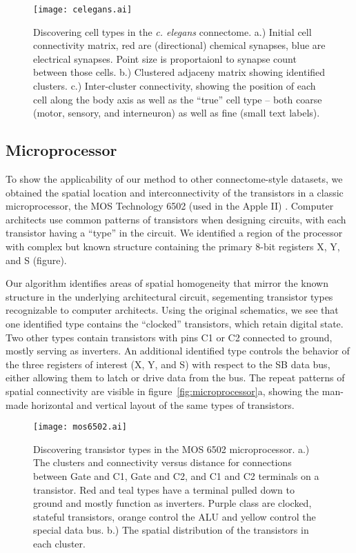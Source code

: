 \documentclass{article}
\begin{document}
\begin{figure}
  \centering 
  \centerline{\texttt{[image: celegans.ai]}}
  \caption{Discovering cell types in the \textit{c. elegans}
    connectome. a.) Initial cell connectivity matrix, red are
    (directional) chemical synapses, blue are electrical
    synapses. Point size is proportaionl to synapse count between
    those cells. b.) Clustered adjaceny matrix showing identified
    clusters. c.) Inter-cluster connectivity, showing the position of
    each cell along the body axis as well as the ``true'' cell type --
    both coarse (motor, sensory, and interneuron) as well as fine
    (small text labels). }
  \label{fig:celegans}
\end{figure}

\subsection{Microprocessor}

To show the applicability of our method to other connectome-style
datasets, we obtained the spatial location and interconnectivity of
the transistors in a classic microprocessor, the MOS Technology 6502
(used in the Apple II) \autocite{James2010}. Computer architects use
common patterns of transistors when designing circuits, with each
transistor having a ``type'' in the circuit. We identified a region of
the processor with complex but known structure containing the primary
8-bit registers X, Y, and S (figure).

Our algorithm identifies areas of spatial homogeneity that mirror the
known structure in the underlying architectural circuit, segementing
transistor types recognizable to computer architects. Using the
original schematics, we see that one identified type contains the
``clocked'' transistors, which retain digital state. Two other types
contain transistors with pins C1 or C2 connected to ground, mostly
serving as inverters.  An additional identified type controls the
behavior of the three registers of interest (X, Y, and S) with respect
to the SB data bus, either allowing them to latch or drive data from
the bus. The repeat patterns of spatial connectivity are visible in
figure~\ref{fig:microprocessor}a, showing the man-made horizontal and
vertical layout of the same types of transistors.



\begin{figure}
  \centering 
  \centerline{\texttt{[image: mos6502.ai]}}
  \caption{Discovering transistor types in the MOS 6502
    microprocessor. a.) The clusters and connectivity versus distance
    for connections between Gate and C1, Gate and C2, and C1 and C2
    terminals on a transistor. Red and teal types have a terminal
    pulled down to ground and mostly function as inverters. Purple
    class are clocked, stateful transistors, orange control the ALU
    and yellow control the special data bus. b.) The spatial
    distribution of the transistors in each cluster. }
\label{fig:mos6502}
\end{figure}
\end{document}

